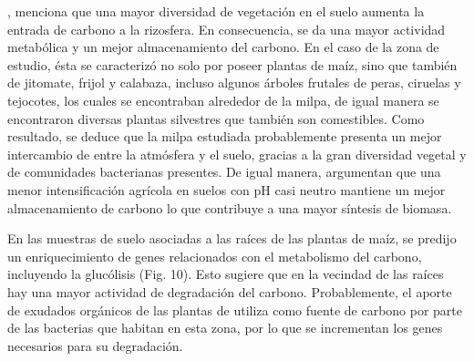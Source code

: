 \documentclass[12pt,letterpaper,oneside]{report}
\begin{document}
\par
\textcite{Lange2015}, menciona que una mayor diversidad de vegetación en el suelo aumenta la entrada de carbono a la rizosfera. En consecuencia, se da una mayor actividad metabólica y un mejor almacenamiento del carbono. En el caso de la zona de estudio, ésta se caracterizó no solo por poseer plantas de maíz, sino que también de jitomate, frijol y calabaza, incluso algunos árboles frutales de peras, ciruelas y tejocotes, los cuales se encontraban alrededor de la milpa, de igual manera se encontraron diversas plantas silvestres que también son comestibles. Como resultado, se deduce que la milpa estudiada probablemente presenta un mejor intercambio de  entre la atmósfera y el suelo, gracias a la gran diversidad vegetal y de comunidades bacterianas presentes. De igual manera, \textcite{Malik2018} argumentan que una menor intensificación agrícola en suelos con pH casi neutro mantiene un mejor almacenamiento de carbono lo que contribuye a una mayor síntesis de biomasa.
\par
En las muestras de suelo asociadas a las raíces de las plantas de maíz, se predijo un enriquecimiento de genes relacionados con el metabolismo del carbono, incluyendo la glucólisis (Fig. 10). Esto sugiere que en la vecindad de las raíces hay una mayor actividad de degradación del carbono. Probablemente, el aporte de exudados orgánicos de las plantas de utiliza como fuente de carbono por parte de las bacterias que habitan en esta zona, por lo que se incrementan los genes necesarios para su degradación. 
\end{document}
